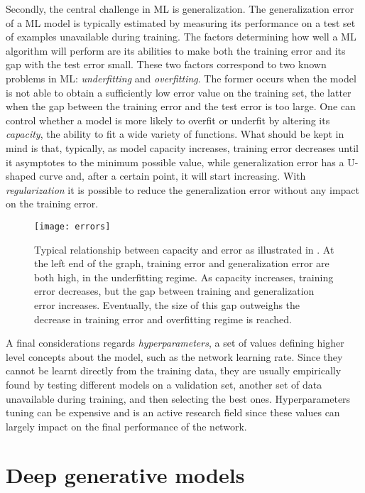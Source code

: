 Secondly, the central challenge in ML is generalization. The generalization error of a ML model is typically estimated by measuring its performance on a test set of examples unavailable during training. The factors determining how well a ML algorithm will perform are its abilities to make both the training error and its gap with the test error small. These two factors correspond to two known problems in ML: \textit{underfitting} and \textit{overfitting}. The former occurs when the model is not able to obtain a sufficiently low error value on the training set, the latter when the gap between the training error and the test error is too large. One can control whether a model is more likely to overfit or underfit by altering its \textit{capacity}, the ability to fit a wide variety of functions. What should be kept in mind is that, typically, as model capacity increases, training error decreases until it asymptotes to the minimum possible value, while generalization error has a U-shaped curve and, after a certain point, it will start increasing. With \textit{regularization} it is possible to reduce the generalization error without any impact on the training error.


\begin{figure}[ht]
\centering
\texttt{[image: errors]}
\caption{Typical relationship between capacity and error as illustrated in \cite{The_DL_book}. At the left end of the graph, training error and generalization error are both high, in the underfitting regime. As capacity increases, training error decreases, but the gap between training and generalization error increases. Eventually, the size of this gap outweighs the decrease in training error and overfitting regime is reached.}
\end{figure}


A final considerations regards \textit{hyperparameters}, a set of values defining higher level concepts about the model, such as the network learning rate. Since they cannot be learnt directly from the training data, they are usually empirically found by testing different models on a validation set, another set of data unavailable during training, and then selecting the best ones. Hyperparameters tuning can be expensive and is an active research field since these values can largely impact on the final performance of the network.




\section{Deep generative models}



